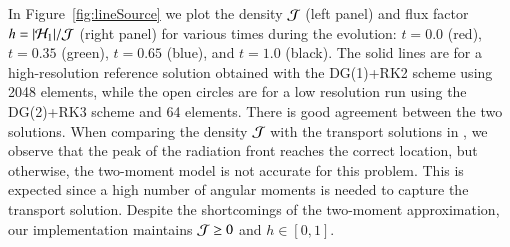 \documentclass[11pt,letterpaper,twoside,english,final]{article}
\begin{document}
In Figure~\ref{fig:lineSource} we plot the density $\mathcal{J}$ (left panel) and flux factor $h=|\mathcal{H}_{1}|/\mathcal{J}$ (right panel) for various times during the evolution: $t=0.0$ (red), $t=0.35$ (green), $t=0.65$ (blue), and $t=1.0$ (black).  
The solid lines are for a high-resolution reference solution obtained with the DG(1)+RK2 scheme using 2048 elements, while the open circles are for a low resolution run using the DG(2)+RK3 scheme and 64 elements.  
There is good agreement between the two solutions.  
When comparing the density $\mathcal{J}$ with the transport solutions in \citet{garrettHauck_2013}, we observe that the peak of the radiation front reaches the correct location, but otherwise, the two-moment model is not accurate for this problem.  
This is expected since a high number of angular moments is needed to capture the transport solution.  
Despite the shortcomings of the two-moment approximation, our implementation maintains $\mathcal{J}\ge0$ and $h\in[0,1]$.  
\end{document}
